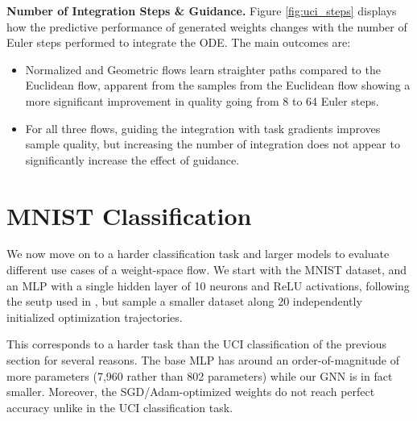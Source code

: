 \textbf{Number of Integration Steps \& Guidance.} Figure \ref{fig:uci_steps} displays how the predictive performance of generated weights changes with the number of Euler steps performed to integrate the ODE. The main outcomes are:
\begin{itemize}
    \item Normalized and Geometric flows learn straighter paths compared to the Euclidean flow, apparent from the samples from the Euclidean flow showing a more significant improvement in quality going from 8 to 64 Euler steps. 
    \item For all three flows, guiding the integration with task gradients improves sample quality, but increasing the number of integration does not appear to significantly increase the effect of guidance. 
\end{itemize}


\section{MNIST Classification} \label{sec:mnist_classification}

We now move on to a harder classification task and larger models to evaluate different use cases of a weight-space flow. We start with the MNIST dataset, and an MLP with a single hidden layer of 10 neurons and ReLU activations, following the seutp used in \citep{peeblesLearningLearnGenerative2022}, but sample a smaller dataset along 20 independently initialized optimization trajectories.

This corresponds to a harder task than the UCI classification of the previous section for several reasons. The base MLP has around an order-of-magnitude of more parameters (7,960 rather than 802 parameters) while our GNN is in fact smaller. Moreover, the SGD/Adam-optimized weights do not reach perfect accuracy unlike in the UCI classification task. 

